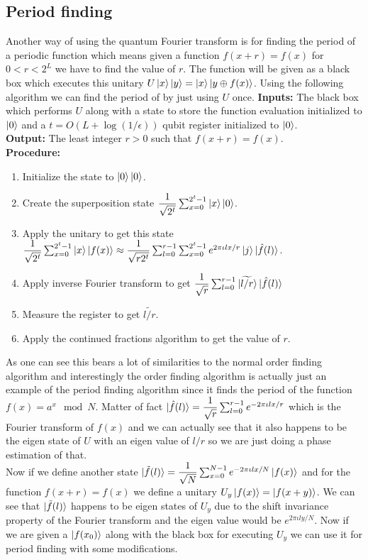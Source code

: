 \documentclass{report}
\begin{document}
\subsection{Period finding}
Another way of using the quantum Fourier transform is for finding the period of a periodic function which means given a function $f(x+r) = f(x)$ for $0 < r < 2^L$
we have to find the value of $r$. The function will be given as a black box which executes this unitary $U\ket{x}\ket{y} = \ket{x}\ket{y \oplus f(x)}$. Using the following algorithm we can find the period of by just using $U$ once.
\textbf{Inputs: }The black box which performs $U$ along with a state to store the function evaluation initialized to $\ket{0}$ and a $t = O(L + \log(1/\epsilon))$ qubit register initialized to $\ket{0}$.\\
\textbf{Output: }The least integer $r > 0$ such that $f(x+r) = f(x)$.\\
\textbf{Procedure:}
\begin{enumerate}
    \item Initialize the state to $\ket{0}\ket{0}$.
    \item Create the superposition state $\dfrac{1}{\sqrt{2^t}}\sum_{x=0}^{2^t-1}\ket{x}\ket{0}$.
    \item Apply the unitary to get this state $\dfrac{1}{\sqrt{2^t}}\sum_{x=0}^{2^t-1}\ket{x}\ket{f(x)} \approx \dfrac{1}{\sqrt{r2^t}}\sum_{l=0}^{r-1}\sum_{x=0}^{2^t-1}e^{2\pi\iota{lx}/r}\ket{j}\ket{\hat{f}(l)}$.
    \item Apply inverse Fourier transform to get $\dfrac{1}{\sqrt{r}}\sum_{l=0}^{r-1}\ket{\widetilde{l/r}}\ket{\hat{f}(l)}$
    \item Measure the register to get $\widetilde{l/r}$.
    \item Apply the continued fractions algorithm to get the value of $r$.
\end{enumerate}
As one can see this bears a lot of similarities to the normal order finding algorithm and interestingly the order finding algorithm is actually just an example of the period finding algorithm since it finds the period of the function $f(x) = a^x\mod N$. Matter of fact $\ket{\hat{f}(l)} = \dfrac{1}{\sqrt{r}}\sum_{l=0}^{r-1}e^{-2\pi\iota{lx}/r}$ which is the Fourier transform of $f(x)$ and we can actually see that it also happens to be the eigen state of $U$ with an eigen value of $l/r$ so we are just doing a phase estimation of that.\\
Now if we define another state $\ket{\tilde{f}(l)} = \dfrac{1}{\sqrt{N}}\sum_{x=0}^{N-1}e^{-2\pi\iota{lx}/N}\ket{f(x)}$ and for the function $f(x+r) = f(x)$ we define a unitary $U_{y}\ket{f(x)} = \ket{f(x+y)}$. We can see that $\ket{\tilde{f}(l)}$ happens to be eigen states of $U_y$ due to the shift invariance property of the Fourier transform and the eigen value would be $e^{2\pi\iota{ly}/N}$. Now if we are given a $\ket{f(x_0)}$ along with the black box for executing $U_y$ we can use it for period finding with some modifications.
\end{document}

